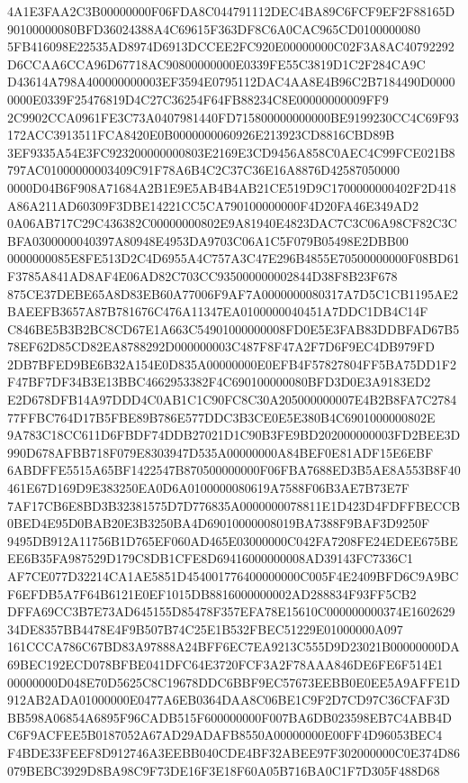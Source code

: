 \documentclass[UTF8,fontset=fandol,zihao=-4,a4paper]{ctexart}
\begin{document}
{{4A1E3FAA2C3B00000000F06FDA8C044791112DEC4BA89C6FCF9EF2F88165D90100000080BFD36024388A4C69615F363DF8C6A0CAC965CD0100000080
5FB416098E22535AD8974D6913DCCEE2FC920E00000000C02F3A8AC40792292D6CCAA6CCA96D67718AC90800000000E0339FE55C3819D1C2F284CA9C
D43614A798A400000000003EF3594E0795112DAC4AA8E4B96C2B7184490D00000000E0339F25476819D4C27C36254F64FB88234C8E00000000009FF9
2C9902CCA0961FE3C73A0407981440FD715800000000000BE9199230CC4C69F93172ACC3913511FCA8420E0B0000000060926E213923CD8816CBD89B
3EF9335A54E3FC923200000000803E2169E3CD9456A858C0AEC4C99FCE021B8797AC01000000003409C91F78A6B4C2C37C36E16A8876D42587050000
0000D04B6F908A71684A2B1E9E5AB4B4AB21CE519D9C1700000000402F2D418A86A211AD60309F3DBE14221CC5CA790100000000F4D20FA46E349AD2
0A06AB717C29C436382C00000000802E9A81940E4823DAC7C3C06A98CF82C3CBFA0300000040397A80948E4953DA9703C06A1C5F079B05498E2DBB00
0000000085E8FE513D2C4D6955A4C757A3C47E296B4855E70500000000F08BD61F3785A841AD8AF4E06AD82C703CC935000000002844D38F8B23F678
875CE37DEBE65A8D83EB60A77006F9AF7A0000000080317A7D5C1CB1195AE2BAEEFB3657A87B781676C476A11347EA0100000040451A7DDC1DB4C14F
C846BE5B3B2BC8CD67E1A663C54901000000008FD0E5E3FAB83DDBFAD67B578EF62D85CD82EA8788292D000000003C487F8F47A2F7D6F9EC4DB979FD
2DB7BFED9BE6B32A154E0D835A00000000E0EFB4F57827804FF5BA75DD1F2F47BF7DF34B3E13BBC4662953382F4C690100000080BFD3D0E3A9183ED2
E2D678DFB14A97DDD4C0AB1C1C90FC8C30A205000000007E4B2B8FA7C278477FFBC764D17B5FBE89B786E577DDC3B3CE0E5E380B4C6901000000802E
9A783C18CC611D6FBDF74DDB27021D1C90B3FE9BD202000000003FD2BEE3D990D678AFBB718F079E8303947D535A00000000A84BEF0E81ADF15E6EBF
6ABDFFE5515A65BF1422547B870500000000F06FBA7688ED3B5AE8A553B8F40461E67D169D9E383250EA0D6A0100000080619A7588F06B3AE7B73E7F
7AF17CB6E8BD3B32381575D7D776835A0000000078811E1D423D4FDFFBECCB0BED4E95D0BAB20E3B3250BA4D69010000008019BA7388F9BAF3D9250F
9495DB912A11756B1D765EF060AD465E03000000C042FA7208FE24EDEE675BEEE6B35FA987529D179C8DB1CFE8D69416000000008AD39143FC7336C1
AF7CE077D32214CA1AE5851D454001776400000000C005F4E2409BFD6C9A9BCF6EFDB5A7F64B6121E0EF1015DB8816000000002AD288834F93FF5CB2
DFFA69CC3B7E73AD645155D85478F357EFA78E15610C000000000374E160262934DE8357BB4478E4F9B507B74C25E1B532FBEC51229E01000000A097
161CCCA786C67BD83A97888A24BFF6EC7EA9213C555D9D23021B00000000DA69BEC192ECD078BFBE041DFC64E3720FCF3A2F78AAA846DE6FE6F514E1
00000000D048E70D5625C8C19678DDC6BBF9EC57673EEBB0E0EE5A9AFFE1D912AB2ADA01000000E0477A6EB0364DAA8C06BE1C9F2D7CD97C36CFAF3D
BB598A06854A6895F96CADB515F600000000F007BA6DB023598EB7C4ABB4DC6F9ACFEE5B0187052A67AD29ADAFB8550A00000000E00FF4D96053BEC4
F4BDE33FEEF8D912746A3EEBB040CDE4BF32ABEE97F302000000C0E374D86079BEBC3929D8BA98C9F73DE16F3E18F60A05B716BA0C1F7D305F488D68
}}
\end{document}
